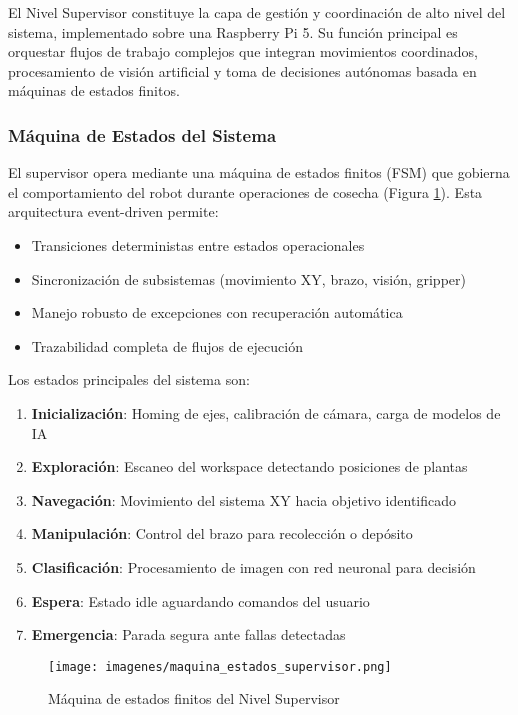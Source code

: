 El Nivel Supervisor constituye la capa de gestión y coordinación de alto nivel del sistema, implementado sobre una Raspberry Pi 5. Su función principal es orquestar flujos de trabajo complejos que integran movimientos coordinados, procesamiento de visión artificial y toma de decisiones autónomas basada en máquinas de estados finitos.

\subsubsection{Máquina de Estados del Sistema}

El supervisor opera mediante una máquina de estados finitos (FSM) que gobierna el comportamiento del robot durante operaciones de cosecha (Figura \ref{fig:maquina_estados_supervisor}). Esta arquitectura event-driven permite:

\begin{itemize}
    \item Transiciones deterministas entre estados operacionales
    \item Sincronización de subsistemas (movimiento XY, brazo, visión, gripper)
    \item Manejo robusto de excepciones con recuperación automática
    \item Trazabilidad completa de flujos de ejecución
\end{itemize}

Los estados principales del sistema son:

\begin{enumerate}
    \item \textbf{Inicialización}: Homing de ejes, calibración de cámara, carga de modelos de IA
    \item \textbf{Exploración}: Escaneo del workspace detectando posiciones de plantas
    \item \textbf{Navegación}: Movimiento del sistema XY hacia objetivo identificado
    \item \textbf{Manipulación}: Control del brazo para recolección o depósito
    \item \textbf{Clasificación}: Procesamiento de imagen con red neuronal para decisión
    \item \textbf{Espera}: Estado idle aguardando comandos del usuario
    \item \textbf{Emergencia}: Parada segura ante fallas detectadas
\end{enumerate}

\begin{figure}[H]
    \centering
    \texttt{[image: imagenes/maquina\_estados\_supervisor.png]}
    \caption{Máquina de estados finitos del Nivel Supervisor}
    \label{fig:maquina_estados_supervisor}
\end{figure}

